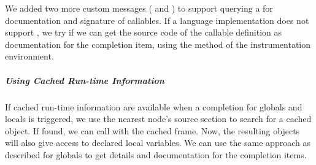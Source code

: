     We added two more custom messages ( and ) to support querying a  for documentation and signature of callables. If a language implementation does not support , we try if we can get the source code of the callable definition as documentation for the completion item, using the method  of the instrumentation environment.

    \subparagraph{Using Cached Run-time Information}
    If cached run-time information are available when a completion for globals and locals is triggered, we use the nearest node's source section to search for a cached  object. If found, we can call  with the cached frame. Now, the resulting  objects will also give access to declared local variables. We can use the same approach as described for globals to get details and documentation for the completion items.

